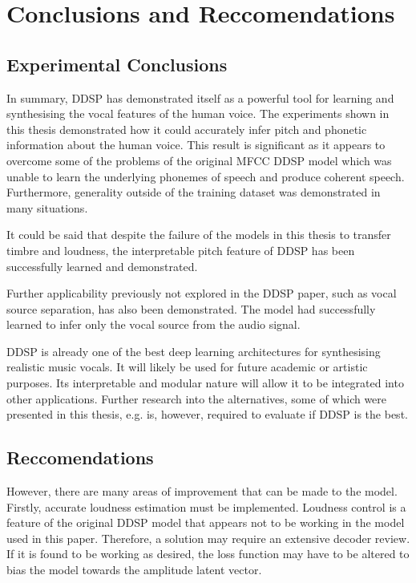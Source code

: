 \chapter{Conclusions and Reccomendations}

\section{Experimental Conclusions}

In summary, DDSP has demonstrated itself as a powerful tool for learning and synthesising the vocal features of the human voice. The experiments shown in this thesis demonstrated how it could accurately infer pitch and phonetic information about the human voice. This result is significant as it appears to overcome some of the problems of the original MFCC DDSP model\cite{SingingDDSP} which was unable to learn the underlying phonemes of speech and produce coherent speech. Furthermore, generality outside of the training dataset was demonstrated in many situations.

It could be said that despite the failure of the models in this thesis to transfer timbre and loudness, the interpretable pitch feature of DDSP has been successfully learned and demonstrated.

Further applicability previously not explored in the DDSP paper, such as vocal source separation, has also been demonstrated. The model had successfully learned to infer only the vocal source from the audio signal.

DDSP is already one of the best deep learning architectures for synthesising realistic music vocals. It will likely be used for future academic or artistic purposes. Its interpretable and modular nature will allow it to be integrated into other applications. Further research into the alternatives, some of which were presented in this thesis, e.g.  is, however, required to evaluate if DDSP is the best.

\section{Reccomendations}

However, there are many areas of improvement that can be made to the model. Firstly, accurate loudness estimation must be implemented. Loudness control is a feature of the original DDSP model\cite{OriginalDDSP} that appears not to be working in the model used in this paper. Therefore, a solution may require an extensive decoder review. If it is found to be working as desired, the loss function may have to be altered to bias the model towards the amplitude latent vector.

